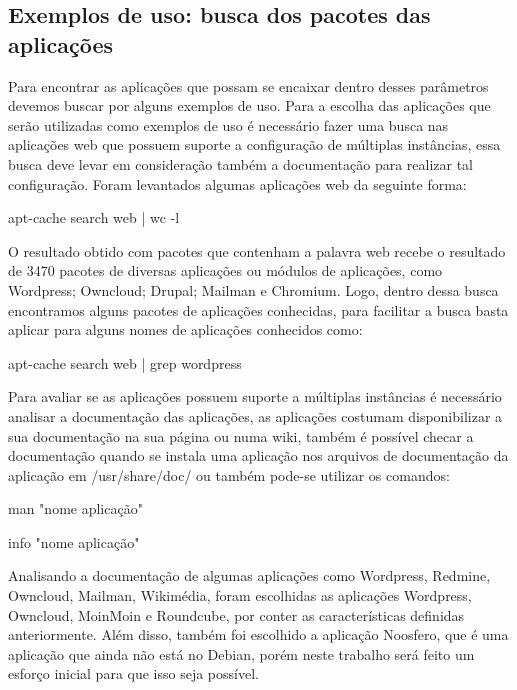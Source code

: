 \subsection{Exemplos de uso: busca dos pacotes das aplicações}
\label{subsection:exemplos}

Para encontrar as aplicações que possam se encaixar dentro desses parâmetros
devemos buscar por alguns exemplos de uso. Para a escolha das aplicações que
serão utilizadas como exemplos de uso é necessário fazer uma busca nas aplicações
web  que possuem suporte a configuração de múltiplas
instâncias, essa busca deve levar em consideração também a documentação para realizar
tal configuração. Foram levantados algumas aplicações web da seguinte forma:

\begin{center}
apt-cache search web | wc -l
\end{center}

O resultado obtido com pacotes que contenham a palavra web recebe o resultado de 3470
pacotes de diversas aplicações ou módulos de aplicações, como
Wordpress; Owncloud; Drupal; Mailman e Chromium. Logo, dentro dessa busca
encontramos alguns pacotes de aplicações conhecidas, para facilitar a busca basta
aplicar para alguns nomes de aplicações conhecidos como:

\begin{center}
apt-cache search web | grep wordpress
\end{center}

Para avaliar se as aplicações possuem suporte a múltiplas instâncias é necessário
analisar a documentação das aplicações, as aplicações costumam disponibilizar a sua
documentação na sua página ou numa wiki, também é possível checar a documentação
quando se instala uma aplicação nos arquivos de documentação da aplicação em
/usr/share/doc/ ou também pode-se utilizar os comandos:

\begin{center}
man "nome aplicação"

info "nome aplicação"
\end{center}

Analisando a documentação de algumas aplicações como Wordpress, Redmine,
Owncloud, Mailman, Wikimédia, foram escolhidas as aplicações Wordpress, Owncloud, MoinMoin
e Roundcube, por conter as características definidas anteriormente. Além disso,
também foi escolhido a aplicação Noosfero, que é uma aplicação que ainda não
está no Debian, porém neste trabalho será feito um esforço inicial para que isso
seja possível.

